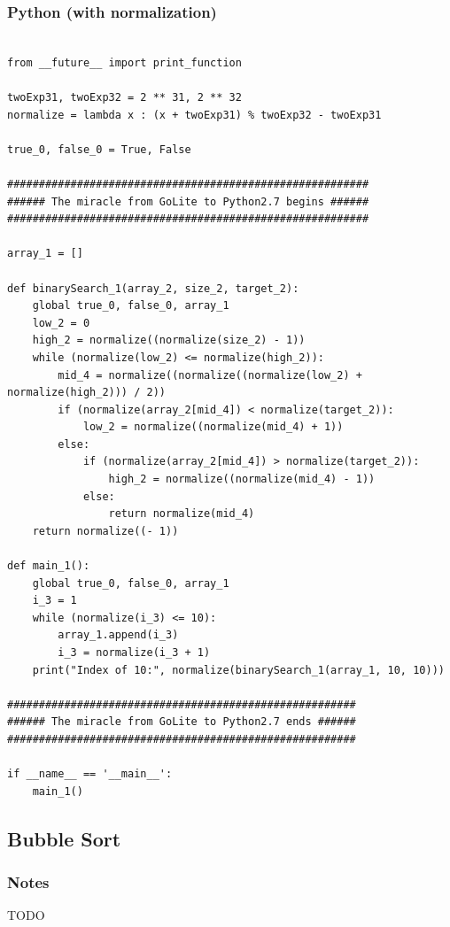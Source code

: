 \documentclass{article}
\begin{document}
\subsubsection{Python (with normalization)}
\begin{lstlisting}

from __future__ import print_function

twoExp31, twoExp32 = 2 ** 31, 2 ** 32
normalize = lambda x : (x + twoExp31) % twoExp32 - twoExp31

true_0, false_0 = True, False

#########################################################
###### The miracle from GoLite to Python2.7 begins ######
#########################################################

array_1 = []

def binarySearch_1(array_2, size_2, target_2):
	global true_0, false_0, array_1
	low_2 = 0
	high_2 = normalize((normalize(size_2) - 1))
	while (normalize(low_2) <= normalize(high_2)):
		mid_4 = normalize((normalize((normalize(low_2) + normalize(high_2))) / 2))
		if (normalize(array_2[mid_4]) < normalize(target_2)):
			low_2 = normalize((normalize(mid_4) + 1))
		else:
			if (normalize(array_2[mid_4]) > normalize(target_2)):
				high_2 = normalize((normalize(mid_4) - 1))
			else:
				return normalize(mid_4)
	return normalize((- 1))

def main_1():
	global true_0, false_0, array_1
	i_3 = 1
	while (normalize(i_3) <= 10):
		array_1.append(i_3)
		i_3 = normalize(i_3 + 1)
	print("Index of 10:", normalize(binarySearch_1(array_1, 10, 10)))

#######################################################
###### The miracle from GoLite to Python2.7 ends ######
#######################################################

if __name__ == '__main__':
	main_1()
\end{lstlisting}

\subsection{Bubble Sort}
\subsubsection{Notes}
TODO 
\end{document}
